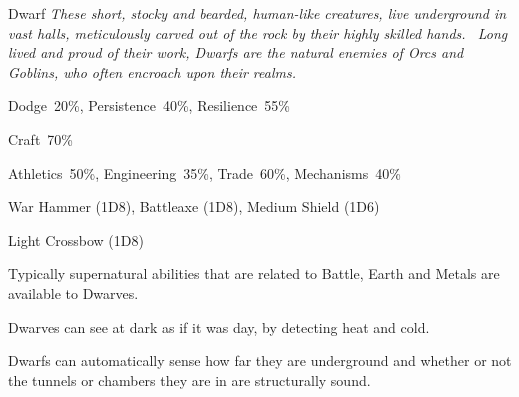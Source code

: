 \begin{monsterbox}{Dwarf}
	\textit{These short, stocky and bearded, human-like creatures, live underground in vast halls, meticulously carved out of the rock by their highly skilled hands.  Long lived and proud of their work, Dwarfs are the natural enemies of Orcs and Goblins, who often encroach upon their realms.}\\
	\rpghline
	\basics[%
        hitpoints  = 15, %
	majorwound = 8,
	damagemodifier = 0,
	powerpoints = 11,
	movementrate = 12m,
	armor = Chainmail (5AP),
	plunderrating = 3
	]
	\rpghline%
	\stats[ %
		STR = 4D6   (14),
		CON = 2D6+12 (19),
		DEX = 3D6   (11),
		SIZ = 1D6+3 (7),
		INT = 2D6+6 (13),
		POW = 3D6   (11),
		CHA = 3D6   (11)
	]
	\rpghline%
	\begin{rpg-monsteraction}[Resistances]
		Dodge~20\%, Persistence~40\%, Resilience~55\%
	\end{rpg-monsteraction}
	\begin{rpg-monsteraction}[Knowledge]
    		Craft~70\%
	\end{rpg-monsteraction}
	\begin{rpg-monsteraction}[Practical]
		Athletics~50\%, Engineering~35\%, Trade~60\%, Mechanisms~40\%
	\end{rpg-monsteraction}
	\begin{rpg-monsteraction}
		War Hammer (1D8), Battleaxe (1D8), Medium Shield (1D6)
	\end{rpg-monsteraction}
	\begin{rpg-monsteraction}
		Light Crossbow (1D8)
	\end{rpg-monsteraction}
	\begin{rpg-monsteraction}[Supernatural]
		Typically supernatural abilities that are related to Battle, Earth and Metals are available to Dwarves.
	\end{rpg-monsteraction}
	\begin{rpg-monsteraction}[Thermoception]
		Dwarves can see at dark as if it was day, by detecting heat and cold.
	\end{rpg-monsteraction}
	\begin{rpg-monsteraction}
		Dwarfs can automatically sense how far they are underground and whether or not the tunnels or chambers they are in are structurally sound.
	\end{rpg-monsteraction}

\end{monsterbox}

